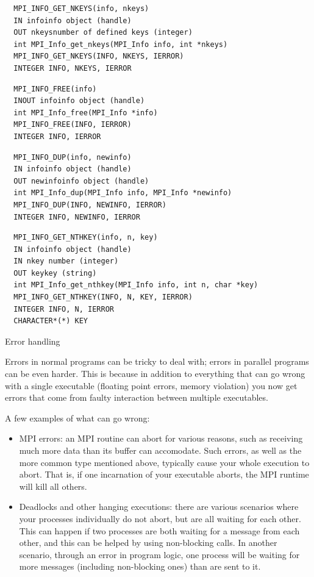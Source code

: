 \begin{verbatim}
  MPI_INFO_GET_NKEYS(info, nkeys)
  IN infoinfo object (handle)
  OUT nkeysnumber of defined keys (integer)
  int MPI_Info_get_nkeys(MPI_Info info, int *nkeys)
  MPI_INFO_GET_NKEYS(INFO, NKEYS, IERROR)
  INTEGER INFO, NKEYS, IERROR
\end{verbatim}

\begin{verbatim}
  MPI_INFO_FREE(info)
  INOUT infoinfo object (handle)
  int MPI_Info_free(MPI_Info *info)
  MPI_INFO_FREE(INFO, IERROR)
  INTEGER INFO, IERROR
\end{verbatim}

\begin{verbatim}
  MPI_INFO_DUP(info, newinfo)
  IN infoinfo object (handle)
  OUT newinfoinfo object (handle)
  int MPI_Info_dup(MPI_Info info, MPI_Info *newinfo)
  MPI_INFO_DUP(INFO, NEWINFO, IERROR)
  INTEGER INFO, NEWINFO, IERROR
\end{verbatim}

\begin{verbatim}
  MPI_INFO_GET_NTHKEY(info, n, key)
  IN infoinfo object (handle)
  IN nkey number (integer)
  OUT keykey (string)
  int MPI_Info_get_nthkey(MPI_Info info, int n, char *key)
  MPI_INFO_GET_NTHKEY(INFO, N, KEY, IERROR)
  INTEGER INFO, N, IERROR
  CHARACTER*(*) KEY
\end{verbatim}

 {Error handling}
\label{sec:mpi:error}

Errors in normal programs can be tricky to deal with; errors in
parallel programs can be even harder. This is because in addition to
everything that can go wrong with a single executable (floating point
errors, memory violation) you now get errors that come from faulty
interaction between multiple executables.

A few examples of what can go wrong:
\begin{itemize}
\item MPI errors: an MPI routine can abort for various reasons, such
  as receiving much more data than its buffer can accomodate. Such
  errors, as well as the more common type mentioned above, typically
  cause your whole execution to abort. That is, if one incarnation of
  your executable aborts, the MPI runtime will kill all others.
\item Deadlocks and other hanging executions: there are various
  scenarios where your processes individually do not abort, but are all
  waiting for each other. This can happen if two processes are both
  waiting for a message from each other, and this can be helped by
  using non-blocking calls. In another scenario, through an error in
  program logic, one process will be waiting for more messages
  (including non-blocking ones) than are sent to it.
\end{itemize}

